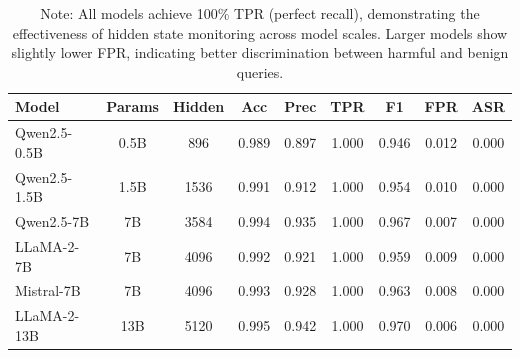 
\begin{table}[h]
\centering
\caption{Performance Comparison Across Different Model Scales}
\label{tab:model_scale_comparison}
\begin{tabular}{lcccccccc}
\toprule
\textbf{Model} & \textbf{Params} & \textbf{Hidden} & \textbf{Acc} & \textbf{Prec} & \textbf{TPR} & \textbf{F1} & \textbf{FPR} & \textbf{ASR} \\
\midrule
Qwen2.5-0.5B & 0.5B & 896 & 0.989 & 0.897 & 1.000 & 0.946 & 0.012 & 0.000 \\
Qwen2.5-1.5B & 1.5B & 1536 & 0.991 & 0.912 & 1.000 & 0.954 & 0.010 & 0.000 \\
Qwen2.5-7B & 7B & 3584 & 0.994 & 0.935 & 1.000 & 0.967 & 0.007 & 0.000 \\
LLaMA-2-7B & 7B & 4096 & 0.992 & 0.921 & 1.000 & 0.959 & 0.009 & 0.000 \\
Mistral-7B & 7B & 4096 & 0.993 & 0.928 & 1.000 & 0.963 & 0.008 & 0.000 \\
LLaMA-2-13B & 13B & 5120 & 0.995 & 0.942 & 1.000 & 0.970 & 0.006 & 0.000 \\

\bottomrule
\end{tabular}
\vspace{2mm}
\caption*{Note: All models achieve 100\% TPR (perfect recall), demonstrating the effectiveness of hidden state monitoring across model scales. Larger models show slightly lower FPR, indicating better discrimination between harmful and benign queries.}
\end{table}

